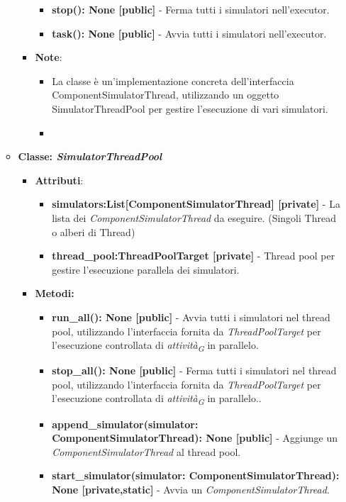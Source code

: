 \begin{itemize}
\begin{itemize}
\begin{itemize}
\begin{itemize}
        \item \textbf{stop(): None [public]} - Ferma tutti i simulatori nell'executor.
        \item \textbf{task(): None [public]} - Avvia tutti i simulatori nell'executor.
    \end{itemize}
    \item\textbf{Note}:
        \begin{itemize}
            \item La classe è un'implementazione concreta dell'interfaccia ComponentSimulatorThread, utilizzando un oggetto SimulatorThreadPool per gestire l'esecuzione di vari simulatori.
            \item 
        \end{itemize}
    \end{itemize}
    \item{\textbf{Classe: \textit{SimulatorThreadPool}}}
    \begin{itemize}
    \item\textbf{Attributi}:
        \begin{itemize}
        \item \textbf{simulators:List[ComponentSimulatorThread] [private]} - La lista dei \textit{ComponentSimulatorThread} da eseguire. (Singoli Thread o alberi di Thread)
        \item \textbf{thread\_pool:ThreadPoolTarget [private]} - Thread pool per gestire l'esecuzione parallela dei simulatori.
    \end{itemize}
    \item \textbf{Metodi: }
    \begin{itemize}
        \item \textbf{run\_all(): None [public]} - Avvia tutti i simulatori nel thread pool, utilizzando l'interfaccia fornita da \textit{ThreadPoolTarget} per l'esecuzione controllata di \textit{attività}\textsubscript{\textit{G}} in parallelo.
        \item \textbf{stop\_all(): None [public]} - Ferma tutti i simulatori nel thread pool, utilizzando l'interfaccia fornita da \textit{ThreadPoolTarget} per l'esecuzione controllata di \textit{attività}\textsubscript{\textit{G}} in parallelo..
        \item \textbf{append\_simulator(simulator: ComponentSimulatorThread): None [public]} - Aggiunge un \textit{ComponentSimulatorThread} al thread pool.
        \item \textbf{start\_simulator(simulator: ComponentSimulatorThread): None [private,static]} - Avvia un \textit{ComponentSimulatorThread}.

\end{itemize}
\end{itemize}
\end{itemize}
\end{itemize}
